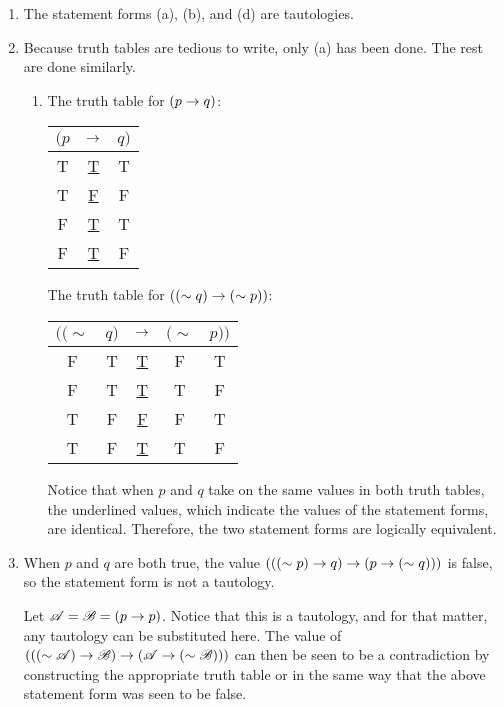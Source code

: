 \begin{enumerate}
  \item %
    The statement forms (a), (b), and (d) are tautologies.

  \item %
    Because truth tables are tedious to write, only (a) has been done. The rest are done similarly.
    \begin{enumerate}[(\alph*), align=left]
      \item The truth table for \((p \rightarrow q)\):

        \begin{tabular}{ccc}
          \((p\)&
          \(\rightarrow\)&
          \(q)\)\\\hline

          T&
          \underline{T}&
          T\\

          T&
          \underline{F}&
          F\\

          F&
          \underline{T}&
          T\\

          F&
          \underline{T}&
          F
        \end{tabular}

        The truth table for \(((\sim q) \rightarrow (\sim p))\):

        \begin{tabular}{ccccc}
          \(((\sim\)&
          \(q)\)&
          \(\rightarrow\)&
          \((\sim\)&
          \(p))\)\\\hline

          F&
          T&
          \underline{T}&
          F&
          T\\

          F&
          T&
          \underline{T}&
          T&
          F\\

          T&
          F&
          \underline{F}&
          F&
          T\\

          T&
          F&
          \underline{T}&
          T&
          F
        \end{tabular}

        Notice that when \(p\) and \(q\) take on the same values in both truth tables, the underlined values, which indicate the values of the statement forms, are identical. Therefore, the two statement forms are logically equivalent.
    \end{enumerate}

  \item %
    When \(p\) and \(q\) are both true, the value \((((\sim p) \rightarrow q) \rightarrow (p \rightarrow (\sim q)))\) is false, so the statement form is not a tautology.

    Let \(\mathscr{A} = \mathscr{B} = (p \rightarrow p)\). Notice that this is a tautology, and for that matter, any tautology can be substituted here. The value of \((((\sim \mathscr{A}) \rightarrow \mathscr{B}) \rightarrow (\mathscr{A} \rightarrow (\sim \mathscr{B})))\) can then be seen to be a contradiction by constructing the appropriate truth table or in the same way that the above statement form was seen to be false.
\end{enumerate}
